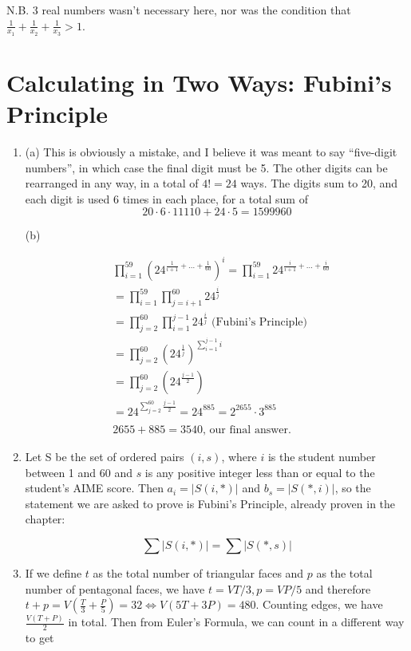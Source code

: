 \documentclass{book}
\numberwithin{equation}{section}
\begin{document}
\begin{enumerate}[label={6.\arabic*}]
N.B. 3 real numbers wasn't necessary here, nor was the condition that $\frac{1}{x_1} + \frac{1}{x_2} + \frac{1}{x_3} > 1$.

\end{enumerate}

\chapter{Calculating in Two Ways: Fubini's Principle}

\begin{enumerate}[label={7.\arabic*}]

\item
(a) This is obviously a mistake, and I believe it was meant to say ``five-digit numbers'', in which case the final digit must
be 5. The other digits can be rearranged in any way, in a total of $4! = 24$ ways. The digits sum to 20, and each digit is
used 6 times in each place, for a total sum of $$20\cdot 6 \cdot 11110 + 24\cdot 5 = 1599960$$

(b)

\begin{align*}
& \prod_{i=1}^{59} (24^{\frac{1}{i+1} + \ldots + \frac{1}{60}})^i = \prod_{i=1}^{59} 24^{\frac{i}{i+1} + \ldots + \frac{i}{60}} \\
& = \prod_{i=1}^{59} \prod_{j=i+1}^{60} 24^{\frac{i}{j}} \\
& = \prod_{j=2}^{60} \prod_{i=1}^{j-1} 24^{\frac{i}{j}} \text{ (Fubini's Principle)} \\
& = \prod_{j=2}^{60} (24^{\frac{1}{j}})^{\sum_{i=1}^{j-1} i} \\
& = \prod_{j=2}^{60} (24^{\frac{j-1}{2}}) \\
& = 24^{\sum_{j=2}^{60} \frac{j-1}{2}} = 24^{885} = 2^{2655}\cdot 3^{885} \\ \\
& 2655 + 885 = 3540 \text{, our final answer.}
\end{align*}

\item
Let S be the set of ordered pairs $(i, s)$, where $i$ is the student number between 1 and 60 and $s$ is any positive
integer less than or equal to the student's
AIME score. Then $a_i = |S(i, *)|$ and $b_s = |S(*, i)|$, so the statement we are asked to prove is Fubini's Principle,
already proven in the chapter:

$$\sum |S(i, *)| = \sum |S(*, s)|$$

\item
If we define $t$ as the total number of triangular faces and $p$ as the total number of pentagonal faces, we have
$t = VT/3, p = VP/5$ and therefore $t + p = V\left( \frac{T}{3} + \frac{P}{5} \right) = 32 \iff V(5T + 3P) = 480$. 
Counting edges, we have $\frac{V(T + P)}{2}$ in total. Then from Euler's Formula, we can count in a different way to
get


\end{enumerate}
\end{document}
